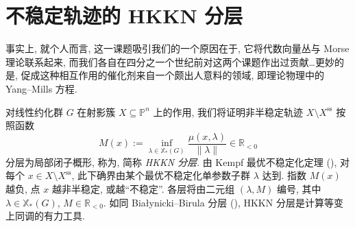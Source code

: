 \section{不稳定轨迹的 HKKN 分层}\label{src:8.7}
\begin{epigraph}
事实上, 就个人而言, 这一课题吸引我们的一个原因在于, 它将代数向量丛与 Morse 理论联系起来, 而我们各自在四分之一个世纪前对这两个课题作出过贡献\ldots 更妙的是, 促成这种相互作用的催化剂来自一个颇出人意料的领域, 即理论物理中的 Yang--Mills 方程.
\end{epigraph}
对线性约化群 $G$ 在射影簇 $X\subseteq\mathbb P^n$ 上的作用, 我们将证明非半稳定轨迹 $X\setminus X^{\mathrm{ss}}$ 按照函数
\[
M(x):=\inf_{\lambda\in\mathbb X_*(G)}\frac{\mu(x,\lambda)}{\|\lambda\|}\in\mathbb R_{<0}
\]
分层为局部闭子概形, 称为, 简称 \textit{HKKN 分层}. 由 Kempf 最优不稳定化定理 (), 对每个 $x\in X\setminus X^{\mathrm{ss}}$, 此下确界由某个最优不稳定化单参数子群 $\lambda$ 达到. 指数 $M(x)$ 越负, 点 $x$ 越非半稳定, 或越``不稳定''. 各层将由二元组 $(\lambda,M)$ 编号, 其中 $\lambda\in\mathbb X_*(G)$, $M\in\mathbb R_{<0}$. 如同 Białynicki--Birula 分层 (), HKKN 分层是计算等变上同调的有力工具.


